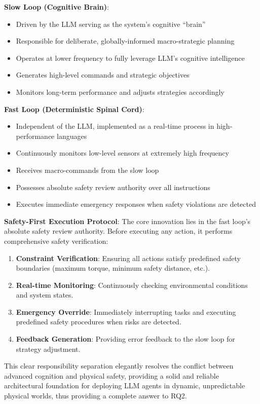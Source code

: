 \textbf{Slow Loop (Cognitive Brain)}: 
\begin{itemize}
\item Driven by the LLM serving as the system's cognitive ``brain''
\item Responsible for deliberate, globally-informed macro-strategic planning
\item Operates at lower frequency to fully leverage LLM's cognitive intelligence
\item Generates high-level commands and strategic objectives
\item Monitors long-term performance and adjusts strategies accordingly
\end{itemize}

\textbf{Fast Loop (Deterministic Spinal Cord)}:
\begin{itemize}
\item Independent of the LLM, implemented as a real-time process in high-performance languages
\item Continuously monitors low-level sensors at extremely high frequency
\item Receives macro-commands from the slow loop
\item Possesses absolute safety review authority over all instructions
\item Executes immediate emergency responses when safety violations are detected
\end{itemize}

\textbf{Safety-First Execution Protocol}: The core innovation lies in the fast loop's absolute safety review authority. Before executing any action, it performs comprehensive safety verification:

\begin{enumerate}
\item \textbf{Constraint Verification}: Ensuring all actions satisfy predefined safety boundaries (maximum torque, minimum safety distance, etc.).
\item \textbf{Real-time Monitoring}: Continuously checking environmental conditions and system states.
\item \textbf{Emergency Override}: Immediately interrupting tasks and executing predefined safety procedures when risks are detected.
\item \textbf{Feedback Generation}: Providing error feedback to the slow loop for strategy adjustment.
\end{enumerate}

This clear responsibility separation elegantly resolves the conflict between advanced cognition and physical safety, providing a solid and reliable architectural foundation for deploying LLM agents in dynamic, unpredictable physical worlds, thus providing a complete answer to RQ2.

